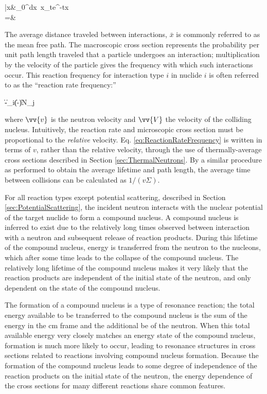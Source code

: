 \beqa
\bar{x}\equiv&\int_0^\infty dx\ x\Sigma_te^{-\Sigma tx}\\
=&\ 
\eeqa

The average distance traveled between interactions, \(\bar{x}\) is commonly referred to as the mean free path. The macroscopic cross section represents the probability per unit path length traveled that a particle undergoes an interaction; multiplication by the velocity of the particle gives the frequency with which such interactions occur. This reaction frequency for interaction type \(i\) in nuclide \(i\) is often referred to as the ``reaction rate frequency:''

\beq
\label{eq:ReactionRateFrequency}
\equiv \|-\|\sigma_i(\|-\|)N_j
\eeq

where \(\vv{v}\) is the neutron velocity and \(\vv{V}\) the velocity of the colliding nucleus. Intuitively, the reaction rate and microscopic cross section must be proportional to the {\it relative} velocity. Eq. \eqref{eq:ReactionRateFrequency} is written in terms of \(v\), rather than the relative velocity, through the use of thermally-average cross sections described in Section \ref{sec:ThermalNeutrons}. By a similar procedure as performed to obtain the average lifetime and path length, the average time between collisions can be calculated as \(1/(v\Sigma)\).\

For all reaction types except potential scattering, described in Section \ref{sec:PotentialScattering}, the incident neutron interacts with the nuclear potential of the target nuclide to form a compound nucleus. A compound nucleus is inferred to exist due to the relatively long times observed between interaction with a neutron and subsequent release of reaction products. During this lifetime of the compound nucleus, energy is transferred from the neutron to the nucleons, which after some time leads to the collapse of the compound nucleus. The relatively long lifetime of the compound nucleus makes it very likely that the reaction products are independent of the initial state of the neutron, and only dependent on the state of the compound nucleus. 

The formation of a compound nucleus is a type of resonance reaction; the total energy available to be transferred to the compound nucleus is the sum of the energy in the \gls{cm} frame and the additional \gls{be} of the neutron. When this total available energy very closely matches an energy state of the compound nucleus, formation is much more likely to occur, leading to resonance structures in cross sections related to reactions involving compound nucleus formation. Because the formation of the compound nucleus leads to some degree of independence of the reaction products on the initial state of the neutron, the energy dependence of the cross sections for many different reactions share common features. 

